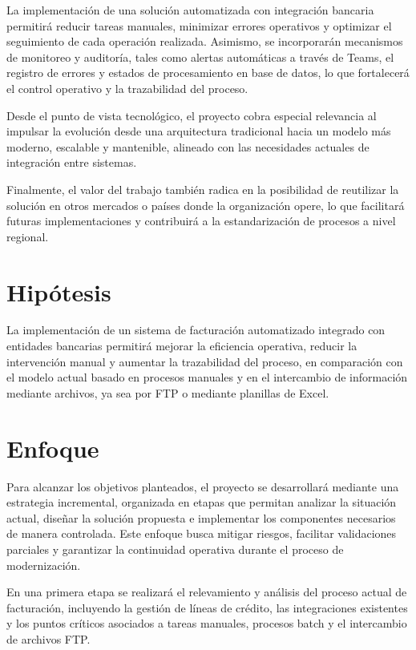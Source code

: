 La implementación de una solución automatizada con integración bancaria permitirá reducir tareas manuales, minimizar errores operativos y optimizar el seguimiento de cada operación realizada. Asimismo, se incorporarán mecanismos de monitoreo y auditoría, tales como alertas automáticas a través de Teams, el registro de errores y estados de procesamiento en base de datos, lo que fortalecerá el control operativo y la trazabilidad del proceso.

Desde el punto de vista tecnológico, el proyecto cobra especial relevancia al impulsar la evolución desde una arquitectura tradicional hacia un modelo más moderno, escalable y mantenible, alineado con las necesidades actuales de integración entre sistemas.

Finalmente, el valor del trabajo también radica en la posibilidad de reutilizar la solución en otros mercados o países donde la organización opere, lo que facilitará futuras implementaciones y contribuirá a la estandarización de procesos a nivel regional.

\section{Hipótesis}

La implementación de un sistema de facturación automatizado integrado con entidades bancarias permitirá mejorar la eficiencia operativa, reducir la intervención manual y aumentar la trazabilidad del proceso, en comparación con el modelo actual basado en procesos manuales y en el intercambio de información mediante archivos, ya sea por FTP o mediante planillas de Excel.

\section{Enfoque}

Para alcanzar los objetivos planteados, el proyecto se desarrollará mediante una estrategia incremental, organizada en etapas que permitan analizar la situación actual, diseñar la solución propuesta e implementar los componentes necesarios de manera controlada. Este enfoque busca mitigar riesgos, facilitar validaciones parciales y garantizar la continuidad operativa durante el proceso de modernización.

En una primera etapa se realizará el relevamiento y análisis del proceso actual de facturación, incluyendo la gestión de líneas de crédito, las integraciones existentes y los puntos críticos asociados a tareas manuales, procesos batch y el intercambio de archivos FTP.

